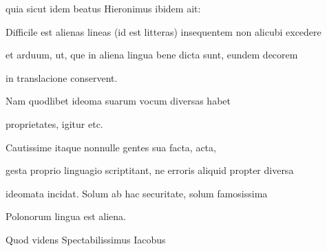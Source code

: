 
quia sicut idem beatus Hieronimus ibidem ait:



\fulllines
Difficile est alienas lineas (id est litteras{\color{red}\footnotemark[23]}) insequentem non alicubi excedere

et arduum, ut, que in aliena lingua bene dicta sunt, eundem decorem

\splitlines

in translacione conservent. 


Nam quodlibet ideoma suarum vocum diversas habet








\renewcommand{\theFancyVerbLine}{\textcolor{green}{05-17\alph{FancyVerbLine}}}
\begin{VerbatimLatin}[firstnumber=1]
proprietates, igitur etc.

\indentK Cautissime itaque nonnulle gentes sua facta, acta,
\end{VerbatimLatin}
\renewcommand{\theFancyVerbLine}{05-\arabic{FancyVerbLine}\phantom{a}}

\begin{VerbatimLatin}[firstnumber=18]
gesta proprio linguagio scriptitant, ne erroris aliquid propter diversa

ideomata incidat. Solum ab hac securitate, solum famosissima
\end{VerbatimLatin}
\renewcommand{\theFancyVerbLine}{\textcolor{green}{05-20\alph{FancyVerbLine}}}
\begin{VerbatimLatin}[firstnumber=1]
Polonorum lingua est aliena.

\indentK Quod videns Spectabilissimus Iacobus
\end{VerbatimLatin}

\renewcommand{\theFancyVerbLine}{05-\arabic{FancyVerbLine}\phantom{a}}


